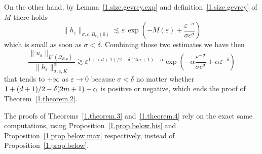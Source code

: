 \documentclass[10pt]{amsart}
\theoremstyle{definition}
\theoremstyle{plain}
\newcommand*\e{\varepsilon}
\newcommand{\alf}{\alpha}%
\newcommand*\dsp{\displaystyle}
\begin{document}
On the other hand, by Lemma~\ref{1.size.gevrey.exp} and definition~\eqref{1.size.gevrey} of $M$ there holds
\[
\|h_{\e}\|_{\sigma,c,B_{r_0}(0)} \lesssim \e\,\exp\left(- M(\e) + \frac{\e^{-\sigma}}{\sigma c^{\sigma}}\right)
\]
which is small as soon as $\sigma < \delta$. Combining those two estimates we have then
\[
\frac{\dsp \|u_{\e}\|_{L^2(\Omega_{R,\rho})}}{\dsp \|h_{\e}\|^{\alf}_{\sigma,c,K}}
\gtrsim
\e^{1+(d+1)/2-\delta(2m+1)-\alf} \exp\left(-\alf \frac{\e^{-\sigma}}{\sigma c^{\sigma}} + \alf \e^{-\delta}\right)
\]
that tends to $+\infty$ as $\e\to0$ because $\sigma < \delta$ no matter whether $1+(d+1)/2\linebreak-\delta(2m+1)-\alf$ is positive or negative, which ends the proof of Theorem~\ref{1.theorem.2}.

The proofs of Theorems~\ref{1.theorem.3} and~\ref{1.theorem.4} rely on the exact same computations, using Proposition~\ref{1.prop.below.bis} and Proposition~\ref{1.prop.below.max} respectively, instead of Proposition~\ref{1.prop.below}.
\end{document}
